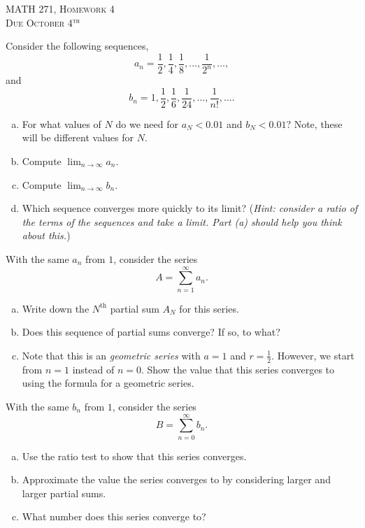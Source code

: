 \documentclass[12pt]{article} %
\begin{document}
\begin{center}
   \textsc{\large MATH 271, Homework 4}\\
   \textsc{Due October 4$^\textrm{th}$}
\end{center}
\vspace{.5cm}

\begin{problem}
Consider the following sequences,
\[
a_n = \frac{1}{2}, \frac{1}{4}, \frac{1}{8}, \dots, \frac{1}{2^n}, \dots,
\]
and
\[
b_n =  1, \frac{1}{2}, \frac{1}{6},\frac{1}{24}, \dots,\frac{1}{n!}, \dots.
\]
\begin{enumerate}[(a)]
    \item For what values of $N$ do we need for $a_N<0.01$ and $b_N<0.01$? Note, these will be different values for $N$.
    \item Compute $\displaystyle{\lim_{n\to \infty} a_n}$.
    \item Compute $\displaystyle{\lim_{n\to \infty} b_n}$.
    \item Which sequence converges more quickly to its limit? (\emph{Hint: consider a ratio of the terms of the sequences and take a limit. Part (a) should help you think about this.})
\end{enumerate}
\end{problem}

\begin{problem}
With the same $a_n$ from $1$, consider the series
\[
A = \sum_{n=1}^\infty a_n.
\]
\begin{enumerate}[(a)]
    \item Write down the $N^\textrm{th}$ partial sum $A_N$ for this series.  
    \item Does this sequence of partial sums converge? If so, to what?
    \item Note that this is an \emph{geometric series} with $a=1$ and $r=\frac{1}{2}$. However, we start from $n=1$ instead of $n=0$. Show the value that this series converges to using the formula for a geometric series.
\end{enumerate}
\end{problem}

\begin{problem}
With the same $b_n$ from $1$, consider the series
\[
B = \sum_{n=0}^\infty b_n.
\]
\begin{enumerate}[(a)]
    \item Use the ratio test to show that this series converges.
    \item Approximate the value the series converges to by considering larger and larger partial sums.
    \item What number does this series converge to?
\end{enumerate}
\end{problem}
\end{document}
